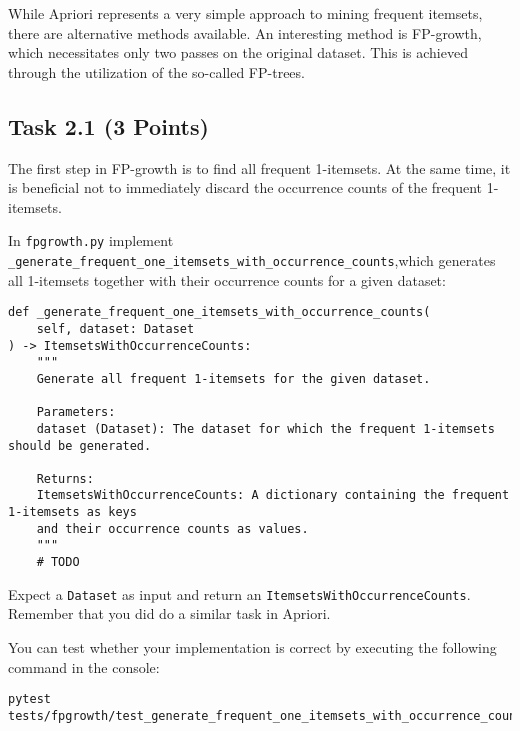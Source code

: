 \documentclass[
english,
smallborders
]{i6prcsht}
\newcommand{\points}[1]{\hfill \color{red}(#1 Points)\color{black}}
\begin{document}
While Apriori represents a very simple approach to mining frequent itemsets, there are alternative methods available. An interesting method is FP-growth, which necessitates only two passes on the original dataset. This is achieved through the utilization of the so-called FP-trees.

\subsection*{Task 2.1 \points{3}}

The first step in FP-growth is to find all frequent 1-itemsets. At the same time, it is beneficial not to immediately discard the occurrence counts of the frequent 1-itemsets.

In \texttt{fpgrowth.py} implement \texttt{\_generate\_frequent\_one\_itemsets\_with\_occurrence\_counts},\newline which generates all 1-itemsets together with their occurrence counts for a given dataset:

\vspace*{0.3cm}

\begin{lstlisting}
def _generate_frequent_one_itemsets_with_occurrence_counts(
	self, dataset: Dataset
) -> ItemsetsWithOccurrenceCounts:
	"""
	Generate all frequent 1-itemsets for the given dataset.

	Parameters:
	dataset (Dataset): The dataset for which the frequent 1-itemsets should be generated.

	Returns:
	ItemsetsWithOccurrenceCounts: A dictionary containing the frequent 1-itemsets as keys
	and their occurrence counts as values.
	"""
	# TODO
\end{lstlisting}

\vspace*{0.1cm}

Expect a \texttt{Dataset} as input and return an \texttt{ItemsetsWithOccurrenceCounts}. Remember that you did do a similar task in Apriori.

You can test whether your implementation is correct by executing the following command in the console:

\vspace*{0.3cm}

\begin{lstlisting}
pytest tests/fpgrowth/test_generate_frequent_one_itemsets_with_occurrence_counts.py
\end{lstlisting}

\vspace*{0.1cm}
\end{document}

